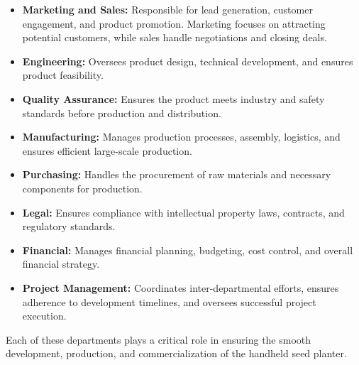 \begin{itemize}
    \item \textbf{Marketing and Sales:}  
    Responsible for lead generation, customer engagement, and product promotion. Marketing focuses on attracting potential customers, while sales handle negotiations and closing deals.

    \item \textbf{Engineering:}  
    Oversees product design, technical development, and ensures product feasibility.

    \item \textbf{Quality Assurance:}  
    Ensures the product meets industry and safety standards before production and distribution.

    \item \textbf{Manufacturing:}  
    Manages production processes, assembly, logistics, and ensures efficient large-scale production.

    \item \textbf{Purchasing:}  
    Handles the procurement of raw materials and necessary components for production.

    \item \textbf{Legal:}  
    Ensures compliance with intellectual property laws, contracts, and regulatory standards.

    \item \textbf{Financial:}  
    Manages financial planning, budgeting, cost control, and overall financial strategy.

    \item \textbf{Project Management:}  
    Coordinates inter-departmental efforts, ensures adherence to development timelines, and oversees successful project execution.
\end{itemize}

Each of these departments plays a critical role in ensuring the smooth development, production, and commercialization of the handheld seed planter.

